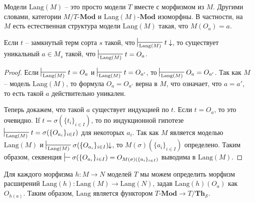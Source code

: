 \documentclass[reqno]{amsart}
\theoremstyle{definition}
\theoremstyle{remark}
\newcommand{\bcat}[1]{\mathbf{#1}}
\newcommand{\Mod}[1]{#1\text{-}\bcat{Mod}}
\newcommand{\fs}[1]{\mathrm{#1}}
\newcommand{\Lang}{\fs{Lang}}
\newcommand{\Th}{\bcat{Th}}
\begin{document}
Модели $\Lang(M)$ -- это просто модели $T$ вместе с морфизмом из $M$.
Другими словами, категории $M/\Mod{T}$ и $\Mod{\Lang(M)}$ изоморфны.
В частности, на $M$ есть естественная структура модели $\Lang(M)$ такая, что $M(O_a) = a$.

\begin{lem}[cl-term]
Если $t$ -- замкнутый терм сорта $s$ такой, что $\sststile{\Lang(M)}{} t \downarrow$,
то существует уникальный $a \in M_s$ такой, что $\sststile{\Lang(M)}{} t = O_a$.
\end{lem}
\begin{proof}
Если $\sststile{\Lang(M)}{} t = O_a$ и $\sststile{\Lang(M)}{} t = O_{a'}$, то $\sststile{\Lang(M)}{} O_a = O_{a'}$.
Так как $M$ -- модель $\Lang(M)$, то формула $O_a = O_{a'}$ верна в $M$, что означает, что $a = a'$, то есть такой $a$ действительно уникален.

Теперь докажем, что такой $a$ существует индукцией по $t$.
Если $t = O_a$, то это очевидно.
If $t = \sigma(\{ t_i \}_{i \in I})$, то по индукционной гипотезе $\sststile{\Lang(M)}{} t = \sigma(\{ O_{a_i} \}_{i \in I})$ для некоторых $a_i$.
Так как $M$ является моделью $\Lang(M)$ и $\sststile{\Lang(M)}{} \sigma(\{ O_{a_i} \}_{i \in I})\!\!\downarrow$, то $M(\sigma)(\{ a_i \}_{i \in I})$ определено.
Таким образом, секвенция $\sststile{}{} \sigma(\{ O_{a_i} \}_{i \in I}) = O_{M(\sigma)(\{ a_i \}_{i \in I})}$ выводима в $\Lang(M)$.
\end{proof}

Для каждого морфизма $h : M \to N$ моделей $T$ мы можем определить морфизм расширений $\Lang(h) : \Lang(M) \to \Lang(N)$, задав $\Lang(h)(O_a)$ как $O_{h(a)}$.
Таким образом, $\Lang$ является функтором $\Mod{T} \to T/\Th_\mathcal{S}$.
\end{document}
